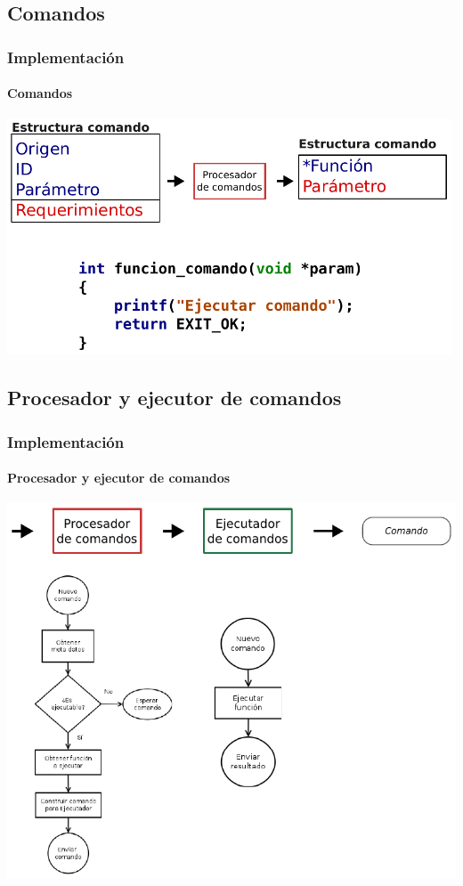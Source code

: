 \documentclass[xcolor=dvipsnames]{beamer}
\begin{document}
    \subsection{Comandos}
    \begin{frame}
        \frametitle{Implementación}
        \framesubtitle{Comandos}
        \begin{center}
            \includegraphics[width=0.99\textwidth]{img/implementacion_comandos.pdf}
        \end{center}
        
    \end{frame}
    
    \subsection{Procesador y ejecutor de comandos}
    \begin{frame}
        \frametitle{Implementación}
        \framesubtitle{Procesador y ejecutor de comandos}
        \begin{center}
            \includegraphics[height=0.99\textheight]{img/implementacion_dispatcher.pdf}
        \end{center}
        
    \end{frame}
    
\end{document}
